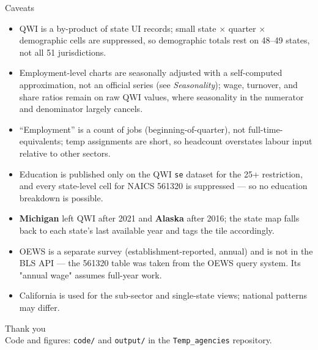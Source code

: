 \documentclass[aspectratio=169,10pt]{beamer}
\begin{document}
\begin{frame}{Caveats}
  \begin{itemize}
    \item QWI is a by-product of state UI records; small state $\times$ quarter
          $\times$ demographic cells are suppressed, so demographic totals rest
          on 48--49 states, not all 51 jurisdictions.
    \item Employment-level charts are seasonally adjusted with a
          self-computed approximation, not an official series (see
          \emph{Seasonality}); wage, turnover, and share ratios remain on
          raw QWI values, where seasonality in the numerator and denominator
          largely cancels.
    \item ``Employment'' is a count of jobs (beginning-of-quarter), not
          full-time-equivalents; temp assignments are short, so headcount
          overstates labour input relative to other sectors.
    \item Education is published only on the QWI \texttt{se} dataset for the
          25+ restriction, and every state-level cell for NAICS 561320 is
          suppressed --- so no education breakdown is possible.
    \item \textbf{Michigan} left QWI after 2021 and \textbf{Alaska} after 2016;
          the state map falls back to each state's last available year and
          tags the tile accordingly.
    \item OEWS is a separate survey (establishment-reported, annual) and is not
          in the BLS API --- the 561320 table was taken from the OEWS query
          system. Its "annual wage" assumes full-year work.
    \item California is used for the sub-sector and single-state views; national
          patterns may differ.
  \end{itemize}
\end{frame}

\begin{frame}[plain]
  \begin{center}
    \Large Thank you\\[1em]
    \normalsize Code and figures: \texttt{code/} and \texttt{output/} in the
    \texttt{Temp\_agencies} repository.
  \end{center}
\end{frame}
\end{document}
